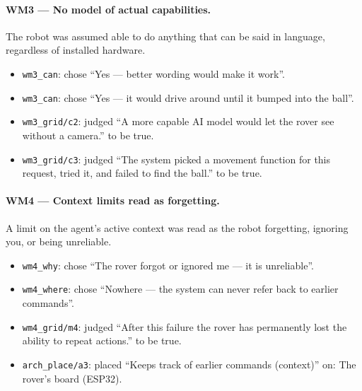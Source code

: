 \paragraph{WM3 --- No model of actual capabilities.} The robot was assumed able to do anything that can be said in language, regardless of installed hardware.
\begin{itemize}
\item \texttt{wm3\_can}: chose \textquotedblleft{}Yes --- better wording would make it work\textquotedblright{}.
\item \texttt{wm3\_can}: chose \textquotedblleft{}Yes --- it would drive around until it bumped into the ball\textquotedblright{}.
\item \texttt{wm3\_grid/c2}: judged \textquotedblleft{}A more capable AI model would let the rover see without a camera.\textquotedblright{} to be true.
\item \texttt{wm3\_grid/c3}: judged \textquotedblleft{}The system picked a movement function for this request, tried it, and failed to find the ball.\textquotedblright{} to be true.
\end{itemize}
\paragraph{WM4 --- Context limits read as forgetting.} A limit on the agent's active context was read as the robot forgetting, ignoring you, or being unreliable.
\begin{itemize}
\item \texttt{wm4\_why}: chose \textquotedblleft{}The rover forgot or ignored me --- it is unreliable\textquotedblright{}.
\item \texttt{wm4\_where}: chose \textquotedblleft{}Nowhere --- the system can never refer back to earlier commands\textquotedblright{}.
\item \texttt{wm4\_grid/m4}: judged \textquotedblleft{}After this failure the rover has permanently lost the ability to repeat actions.\textquotedblright{} to be true.
\item \texttt{arch\_place/a3}: placed \textquotedblleft{}Keeps track of earlier commands (context)\textquotedblright{} on: The rover's board (ESP32).
\end{itemize}

